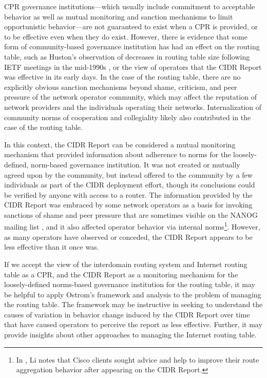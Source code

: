 CPR governance institutions---which usually include commitment to acceptable
behavior as well as mutual monitoring and sanction mechanisms to limit
opportunistic behavior---are not guaranteed to exist when a CPR is provided, or
to be effective even when they do exist. However, there is evidence that some
form of community-based governance institution has had an effect on the routing
table, such as Huston's observation of decreases in routing table size
following IETF meetings in the mid-1990s \cite{Huston:2001bs,Clayton:2010bh},
or the view of operators that the CIDR Report was effective in its early days.
In the case of the routing table, there are no explicitly obvious sanction
mechanisms beyond shame, criticism, and peer pressure of the network operator
community, which may affect the reputation of network providers and the
individuals operating their networks. Internalization of community norms of
cooperation and collegiality \cite{Abbate:2000ve} likely also contributed in
the case of the routing table.

In this context, the CIDR Report can be considered a mutual monitoring
mechanism that provided information about adherence to norms for the
loosely-defined, norm-based governance institution. It was not created or
mutually agreed upon by the community, but instead offered to the community by
a few individuals as part of the CIDR deployment effort, though its conclusions
could be verified by anyone with access to a router. The information provided
by the CIDR Report was embraced by some network operators as a basis for
invoking sanctions of shame and peer pressure that are sometimes visible on the
NANOG mailing list \cite{NANOG}, and it also affected operator behavior via
internal norms\footnote{In \cite{Li:2011vn}, Li notes that Cisco clients sought
advice and help to improve their route aggregation behavior after appearing on
the CIDR Report.}. However, as many operators have observed or conceded, the
CIDR Report appears to be less effective than it once was.

If we accept the view of the interdomain routing system and Internet routing
table as a CPR, and the CIDR Report as a monitoring mechanism for the
loosely-defined norms-based governance institution for the routing table, it
may be helpful to apply Ostrom's framework and analysis to the problem of
managing the routing table. The framework may be instructive in seeking to
understand the causes of variation in behavior change induced by the CIDR
Report over time that have caused operators to perceive the report as less
effective. Further, it may provide insights about other approaches to managing
the Internet routing table.

